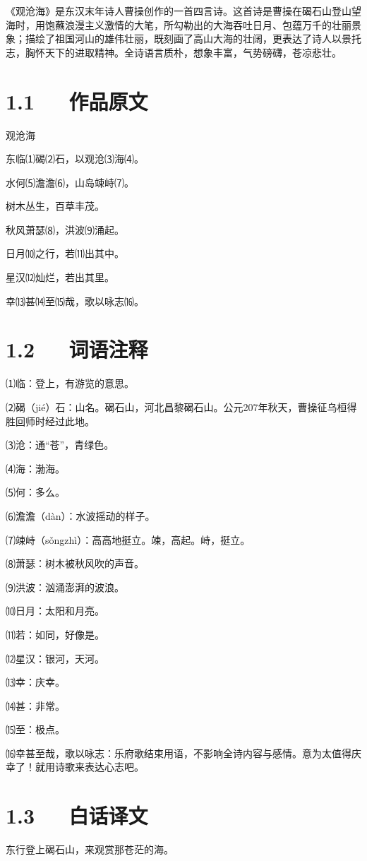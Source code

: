 \documentclass[letterpaper,10pt,english]{sphinxmanual}
\begin{document}
《观沧海》是东汉末年诗人曹操创作的一首四言诗。这首诗是曹操在碣石山登山望海时，用饱蘸浪漫主义激情的大笔，所勾勒出的大海吞吐日月、包蕴万千的壮丽景象；描绘了祖国河山的雄伟壮丽，既刻画了高山大海的壮阔，更表达了诗人以景托志，胸怀天下的进取精神。全诗语言质朴，想象丰富，气势磅礴，苍凉悲壮。


\section{1.1   作品原文}
\label{\detokenize{p01_u6563_u6587/_u66f9_u64cd-_u89c2_u6ca7_u6d77:id3}}
观沧海

东临⑴碣⑵石，以观沧⑶海⑷。

水何⑸澹澹⑹，山岛竦峙⑺。

树木丛生，百草丰茂。

秋风萧瑟⑻，洪波⑼涌起。

日月⑽之行，若⑾出其中。

星汉⑿灿烂，若出其里。

幸⒀甚⒁至⒂哉，歌以咏志⒃。


\section{1.2   词语注释}
\label{\detokenize{p01_u6563_u6587/_u66f9_u64cd-_u89c2_u6ca7_u6d77:id4}}
⑴临：登上，有游览的意思。

⑵碣（jié）石：山名。碣石山，河北昌黎碣石山。公元207年秋天，曹操征乌桓得胜回师时经过此地。

⑶沧：通“苍”，青绿色。

⑷海：渤海。

⑸何：多么。

⑹澹澹（dàn）：水波摇动的样子。

⑺竦峙（sǒngzhì）：高高地挺立。竦，高起。峙，挺立。

⑻萧瑟：树木被秋风吹的声音。

⑼洪波：汹涌澎湃的波浪。

⑽日月：太阳和月亮。

⑾若：如同，好像是。

⑿星汉：银河，天河。

⒀幸：庆幸。

⒁甚：非常。

⒂至：极点。

⒃幸甚至哉，歌以咏志：乐府歌结束用语，不影响全诗内容与感情。意为太值得庆幸了！就用诗歌来表达心志吧。


\section{1.3   白话译文}
\label{\detokenize{p01_u6563_u6587/_u66f9_u64cd-_u89c2_u6ca7_u6d77:id5}}
东行登上碣石山，来观赏那苍茫的海。
\end{document}
